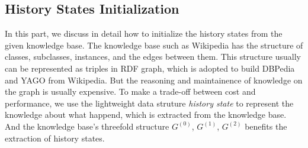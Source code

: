\documentclass{article}
\begin{document}
\subsection{History States Initialization}\label{subsec:hs_initialization}
In this part, we discuss in detail how to initialize the history states from the given knowledge base. 
The knowledge base such as Wikipedia has the structure of classes, subclasses, instances, and the edges between them. 
This structure usually can be represented as triples in RDF graph\cite{klyne2006rdf}, which is adopted to build DBPedia\cite{auer2007dbpedia} and YAGO\cite{suchanek2007yago} from Wikipedia. 
But the reasoning and maintainence of knowledge on the graph is usually expensive\cite{broekstra2003inferencing}\cite{bursztyn2015reasoning}. 
To make a trade-off between cost and performance, we use the lightweight data struture \textit{history state} to represent the knowledge about what happend, which is extracted from the knowledge base.
And the knowledge base's threefold structure \(G^{(0)}\), \(G^{(1)}\), \(G^{(2)}\) benefits the extraction of history states. 
\end{document}
